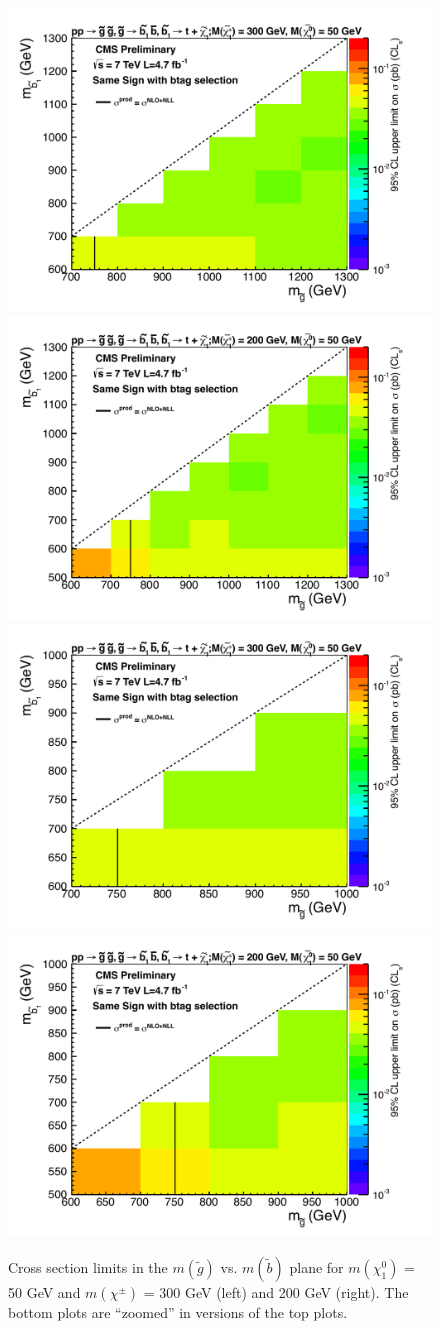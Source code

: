 \begin{figure}[htb]
\begin{center}
\includegraphics[width=0.47\linewidth]{figs/gl_sb_300_50.pdf}
\includegraphics[width=0.47\linewidth]{figs/gl_sb_200_50.pdf}
\includegraphics[width=0.47\linewidth]{figs/gl_sb_300_50_zoom.pdf}
\includegraphics[width=0.47\linewidth]{figs/gl_sb_200_50_zoom.pdf}
\caption{Cross section limits in the $m(\widetilde{g})$ vs. 
$m(\widetilde{b})$ plane
for $m(\chi_1^0)$ = 50 GeV and 
$m(\chi^{\pm})$ = 300 GeV (left) and 200 GeV (right). 
The bottom plots are ``zoomed'' in versions of the top plots.
\label{fig:mglinoSbottom}}
\end{center}
\end{figure}

